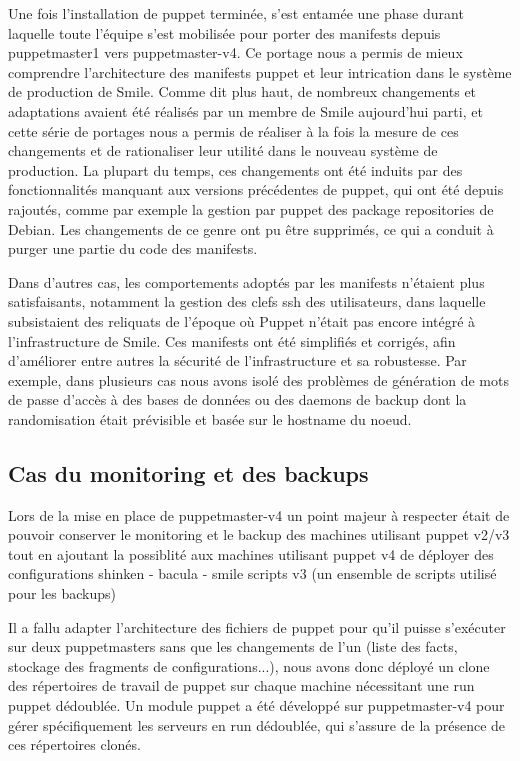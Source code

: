 \documentclass[14 pt,a4paper]{extreport}
\begin{document}
Une fois l'installation de puppet terminée, s'est entamée une phase durant laquelle toute l'équipe s'est mobilisée pour porter des manifests depuis puppetmaster1 vers puppetmaster-v4. Ce portage nous a permis de mieux comprendre l'architecture des manifests puppet et leur intrication dans le système de production de Smile. Comme dit plus haut, de nombreux changements et adaptations avaient été réalisés par un membre de Smile aujourd'hui parti, et cette série de portages nous a permis de réaliser à la fois la mesure de ces changements et de rationaliser leur utilité dans le nouveau système de production. La plupart du temps, ces changements ont été induits par des fonctionnalités manquant aux versions précédentes de puppet, qui ont été depuis rajoutés, comme par exemple la gestion par puppet des package repositories de Debian. Les changements de ce genre ont pu être supprimés, ce qui a conduit à purger une partie du code des manifests.

Dans d'autres cas, les comportements adoptés par les manifests n'étaient plus satisfaisants, notamment la gestion des clefs ssh des utilisateurs, dans laquelle subsistaient des reliquats de l'époque où Puppet n'était pas encore intégré à l'infrastructure de Smile. Ces manifests ont été simplifiés et corrigés, afin d'améliorer entre autres la sécurité de l'infrastructure et sa robustesse. Par exemple, dans plusieurs cas nous avons isolé des problèmes de génération de mots de passe d'accès à des bases de données ou des daemons de backup dont la randomisation était prévisible et basée sur le hostname du noeud.

\subsection{Cas du monitoring et des backups}

Lors de la mise en place de puppetmaster-v4 un point majeur à respecter était de pouvoir conserver le monitoring et le backup des machines utilisant puppet v2/v3 tout en ajoutant la possiblité aux machines utilisant puppet v4 de déployer des configurations shinken - bacula - smile scripts v3 (un ensemble de scripts utilisé pour les backups)

Il a fallu adapter l'architecture des fichiers de puppet pour qu'il puisse s'exécuter sur deux puppetmasters sans que les changements de l'un (liste des facts, stockage des fragments de configurations...), nous avons donc déployé un clone des répertoires de travail de puppet sur chaque machine nécessitant une run puppet dédoublée. Un module puppet a été développé sur puppetmaster-v4 pour gérer spécifiquement les serveurs en run dédoublée, qui s'assure de la présence de ces répertoires clonés.
\end{document}
